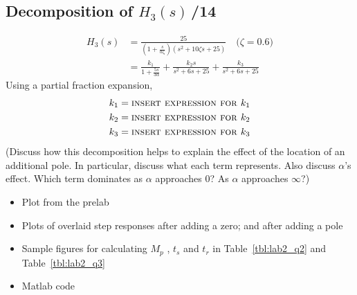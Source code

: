 \documentclass{article}
\newcommand{\score}{\hfill \underline{\hspace{0.65cm}}\,/} %
\begin{document}
\subsection{Decomposition of $H_3(s)$\score 14}
\begin{align*}
H_3(s) &= \frac{25}{\left(1+\frac{s}{\alpha \zeta}\right)\left( s^2 + 10 \zeta s + 25\right) } \mbox{~~~($\zeta = 0.6$)} \\
&= \frac{k_1}{1+\frac{5s}{3\alpha}} + \frac{k_2 s}{s^2+6s+25} + \frac{k_3}{s^2+6s+25}
\end{align*}
Using a partial fraction expansion,
\begin{align*}
k_1 &= \mbox{\sc insert expression for $k_1$}\\
k_2 &= \mbox{\sc insert expression for $k_2$}\\
k_3 &= \mbox{\sc insert expression for $k_3$}
\end{align*}
(Discuss how this decomposition helps to explain the effect of the location of an additional pole. In particular, discuss what each term represents. Also discuss $\alpha$'s effect. Which term dominates as $\alpha$ approaches 0? As $\alpha$ approaches $\infty$?)
\newline \\[10mm]
\begin{itemize}
\item Plot from the prelab
\item Plots of overlaid step responses after adding a zero; and after adding a pole
\item Sample figures for calculating $M_p$ , $t_s$ and $t_r$ in Table~\ref{tbl:lab2_q2} and Table~\ref{tbl:lab2_q3}
\item {\sc Matlab} code
\end{itemize}
\end{document}
